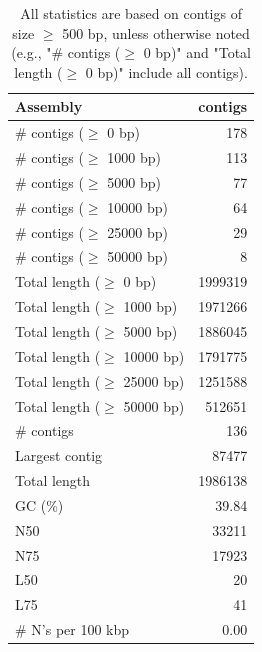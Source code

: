 \documentclass[12pt,a4paper]{article}
\begin{document}
\begin{table}[ht]
\begin{center}
\caption{All statistics are based on contigs of size $\geq$ 500 bp, unless otherwise noted (e.g., "\# contigs ($\geq$ 0 bp)" and "Total length ($\geq$ 0 bp)" include all contigs).}
\begin{tabular}{|l*{1}{|r}|}
\hline
Assembly & contigs \\ \hline
\# contigs ($\geq$ 0 bp) & 178 \\ \hline
\# contigs ($\geq$ 1000 bp) & 113 \\ \hline
\# contigs ($\geq$ 5000 bp) & 77 \\ \hline
\# contigs ($\geq$ 10000 bp) & 64 \\ \hline
\# contigs ($\geq$ 25000 bp) & 29 \\ \hline
\# contigs ($\geq$ 50000 bp) & 8 \\ \hline
Total length ($\geq$ 0 bp) & 1999319 \\ \hline
Total length ($\geq$ 1000 bp) & 1971266 \\ \hline
Total length ($\geq$ 5000 bp) & 1886045 \\ \hline
Total length ($\geq$ 10000 bp) & 1791775 \\ \hline
Total length ($\geq$ 25000 bp) & 1251588 \\ \hline
Total length ($\geq$ 50000 bp) & 512651 \\ \hline
\# contigs & 136 \\ \hline
Largest contig & 87477 \\ \hline
Total length & 1986138 \\ \hline
GC (\%) & 39.84 \\ \hline
N50 & 33211 \\ \hline
N75 & 17923 \\ \hline
L50 & 20 \\ \hline
L75 & 41 \\ \hline
\# N's per 100 kbp & 0.00 \\ \hline
\end{tabular}
\end{center}
\end{table}
\end{document}
